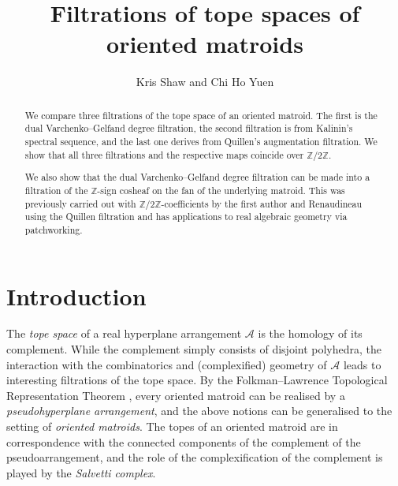 \documentclass{amsart}
\newcommand\Acal{{\mathcal A}}
\begin{document}
\title{Filtrations of tope spaces of oriented matroids}
\author{Kris Shaw and Chi Ho Yuen} 

\maketitle

\begin{abstract}
We compare three filtrations of the tope space of an oriented matroid. 
The first is the dual Varchenko--Gelfand degree filtration, the second filtration is from Kalinin's spectral sequence, and the last one derives from Quillen's augmentation filtration. We show that all three filtrations and the respective maps coincide over $\mathbb{Z}/ 2\mathbb{Z}$. 

We also show that the dual Varchenko--Gelfand degree filtration can be made into a filtration of the $\mathbb{Z}$-sign cosheaf on the fan of the underlying matroid.
This was previously carried out with $\mathbb{Z}/ 2\mathbb{Z}$-coefficients by the first author and Renaudineau using the Quillen filtration and has applications to real algebraic geometry via patchworking.
\end{abstract}

\tableofcontents

\section{Introduction}

The {\em tope space} of a real hyperplane arrangement $\Acal$ is the homology of its complement. While the complement simply consists of disjoint polyhedra, the interaction with the combinatorics and (complexified) geometry of $\Acal$ leads to interesting filtrations of the tope space.
By the Folkman--Lawrence Topological Representation Theorem \cite{FolkmanLawrence}, every oriented matroid can be realised by a {\em pseudohyperplane arrangement}, and the above notions can be generalised to the setting of {\em oriented matroids}.
The topes of an oriented matroid are in correspondence with the connected components of the complement of the pseudoarrangement, and the role of the complexification of the complement is played by the {\em Salvetti complex}.
\end{document}
